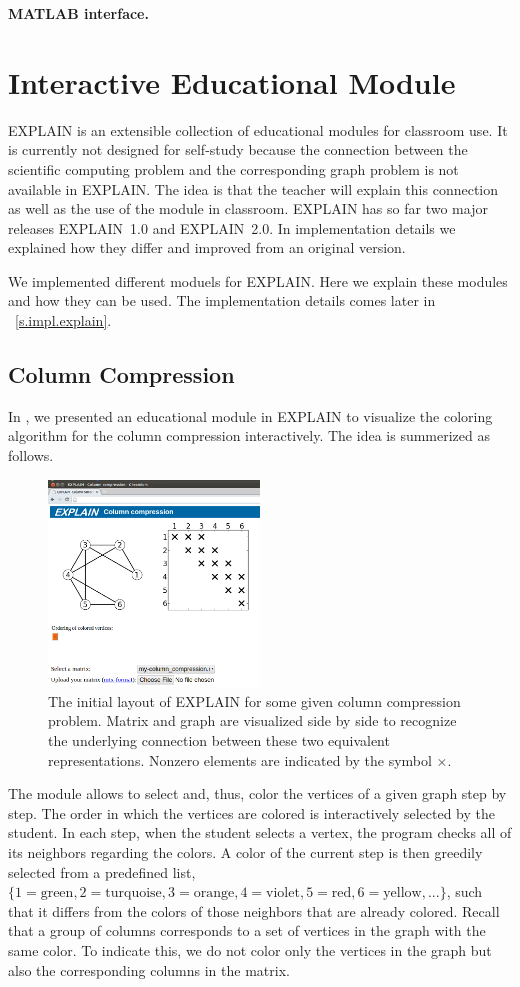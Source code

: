 \documentclass[12pt, oneside]{book}
\begin{document}
\textbf{MATLAB interface.}

\chapter{Interactive Educational Module}
\label{explain}
\mbox{EXPLAIN} is an extensible collection of educational modules for classroom use.
It is currently not designed for self-study because the connection between the scientific computing problem and the corresponding graph problem is not available in \mbox{EXPLAIN}. The idea is that the teacher will explain this connection as well as the use of the module in classroom.
EXPLAIN has so far two major releases \mbox{EXPLAIN 1.0} and \mbox{EXPLAIN 2.0}.
In implementation details we explained how they differ and improved from an original version.

We implemented different moduels for EXPLAIN. 
Here we explain these modules and how they can be used.
The implementation details comes later in ~\ref{s.impl.explain}.
\section{Column Compression}
\label{s.column-compression}
In \cite{2013:05,2014:01}, we presented an educational module in \mbox{EXPLAIN} to visualize the
coloring algorithm for the column compression interactively. The idea is 
summerized as follows.

\begin{figure}
\centering
\includegraphics[width=0.5\textwidth]{fig1.png}
\caption{The initial layout of EXPLAIN for some given column compression problem. Matrix and graph are visualized side by side to recognize the underlying connection between these two equivalent representations. Nonzero elements are indicated by the symbol $\times$.
}
\label{fig1}
\end{figure}
The module allows to select and, thus, color the vertices of a given graph step by step. The order in which the vertices are colored is interactively selected by the student. In each step, when the student selects a vertex, the program checks all of its neighbors regarding the colors. A color of the current step is then greedily selected from a predefined list, $\{1=\text{green}, 2=\text{turquoise}, 3=\text{orange}, 4=\text{violet}, 5=\text{red}, 6=\text{yellow}, ...\}$, such that it differs from the colors of those neighbors that are already colored. Recall that a group of columns corresponds to a set of vertices in the graph with the same color. To indicate this, we do not color only the vertices in the graph but also the corresponding columns in the matrix.
\end{document}
